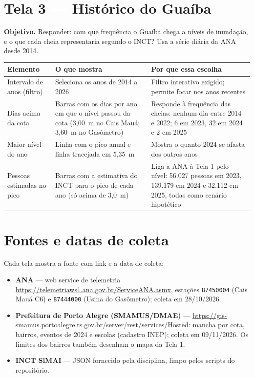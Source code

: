 \documentclass[11pt,a4paper]{article}
\begin{document}
\section{Tela 3 --- Histórico do Guaíba}
\textbf{Objetivo.} Responder: com que frequência o Guaíba chega a níveis de inundação, e o que cada cheia representaria segundo o INCT? Usa a série diária da ANA desde 2014.

\begin{longtable}{L{3.2cm} L{6.2cm} L{6.2cm}}
\toprule
Elemento & O que mostra & Por que essa escolha\\
\midrule
\endhead
Intervalo de anos (filtro) & Seleciona os anos de 2014 a 2026 & Filtro interativo exigido; permite focar nos anos recentes\\
Dias acima da cota & Barras com os dias por ano em que o nível passou da cota (3,00~m no Cais Mauá; 3,60~m no Gasômetro) & Responde à frequência das cheias: nenhum dia entre 2014 e 2022; 6 em 2023, 32 em 2024 e 2 em 2025\\
Maior nível do ano & Linha com o pico anual e linha tracejada em 5,35~m & Mostra o quanto 2024 se afasta dos outros anos\\
Pessoas estimadas no pico & Barras com a estimativa do INCT para o pico de cada ano (só acima de 3,0~m) & Liga a ANA à Tela 1 pelo nível: 56.027 pessoas em 2023, 139.179 em 2024 e 32.112 em 2025, todas como cenário hipotético\\
\bottomrule
\end{longtable}

\section{Fontes e datas de coleta}
Cada tela mostra a fonte com link e a data de coleta:
\begin{itemize}
  \item \textbf{ANA} --- web service de telemetria \url{https://telemetriaws1.ana.gov.br/ServiceANA.asmx}, estações \texttt{87450004} (Cais Mauá C6) e \texttt{87444000} (Usina do Gasômetro); coleta em 28/10/2026.
  \item \textbf{Prefeitura de Porto Alegre (SMAMUS/DMAE)} --- \url{https://gis-smamus.portoalegre.rs.gov.br/server/rest/services/Hosted}: mancha por cota, bairros, eventos de 2024 e escolas (cadastro INEP); coleta em 09/11/2026. Os limites dos bairros também desenham o mapa da Tela 1.
  \item \textbf{INCT SiMAI} --- JSON fornecido pela disciplina, limpo pelos scripts do repositório.
\end{itemize}
\end{document}
